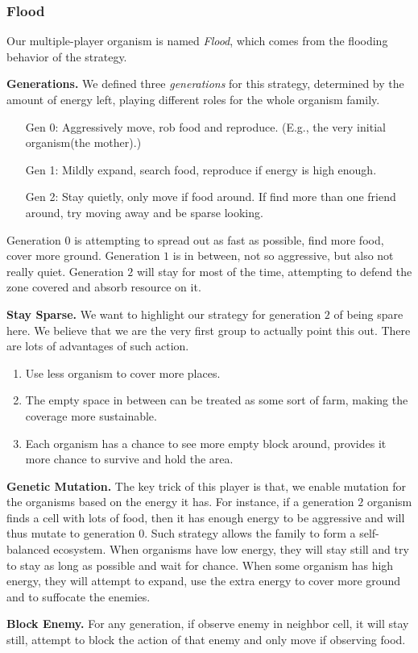\subsubsection{Flood}
Our multiple-player organism is named \textit{Flood}, which comes from the flooding behavior of the strategy. 

\textbf{Generations.} We defined three \textit{generations} for this strategy, determined by the amount of energy left,
playing different roles for the whole organism family.
\begin{itemize}
\item[Gen 0:] Aggressively move, rob food and reproduce. (E.g., the very initial organism(the mother).)
\item[Gen 1:] Mildly expand, search food, reproduce if energy is high enough.
\item[Gen 2:] Stay quietly, only move if food around. If find more than one friend around, try moving away and be sparse looking.
\end{itemize}
Generation $0$ is attempting to spread out as fast as possible, find more food, cover more ground.
Generation $1$ is in between, not so aggressive, but also not really quiet.
Generation $2$ will stay for most of the time, attempting to defend the zone covered and absorb resource on it.

\textbf{Stay Sparse.} We want to highlight our strategy for generation $2$ of being spare here. 
We believe that we are the very first group to actually point this out.
There are lots of advantages of such action.
\begin{enumerate}
\item Use less organism to cover more places.
\item The empty space in between can be treated as some sort of farm, making the coverage more sustainable.
\item Each organism has a chance to see more empty block around, provides it more chance to survive and hold the area. 
\end{enumerate}

\textbf{Genetic Mutation.} The key trick of this player is that, we enable mutation for the organisms based on the energy it has. 
For instance, if a generation $2$ organism finds a cell with lots of food, then it has enough energy to be aggressive and will thus mutate to generation 0.
Such strategy allows the family to form a self-balanced ecosystem. 
When organisms have low energy, they will stay still and try to stay as long as possible and wait for chance.
When some organism has high energy, they will attempt to expand, use the extra energy to cover more ground and to suffocate the enemies. 

\textbf{Block Enemy.} For any generation, if observe enemy in neighbor cell, it will stay still, attempt to block the action of that enemy and only move if observing food.